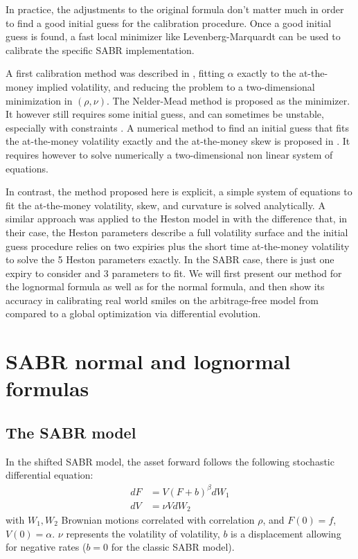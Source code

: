 \documentclass[]{rAMF2e}
\begin{document}
In practice, the adjustments to the original formula don't matter much in order to find a good initial guess for the calibration procedure. Once a good initial guess is found, a fast local minimizer like Levenberg-Marquardt can be used to calibrate the specific SABR implementation. 

A first calibration method was described in \citep{west2005calibration}, fitting $\alpha$ exactly to the at-the-money implied volatility, and reducing the problem to a two-dimensional minimization in $(\rho,\nu)$. The Nelder-Mead method is proposed as the minimizer. It however still requires some initial guess, and can sometimes be unstable, especially with constraints \citep{lefloch2014nelder}. A numerical method to find an initial guess that fits the at-the-money volatility exactly and the at-the-money skew is proposed in \citep{gauthier2009fitting}. It requires however to solve numerically a two-dimensional non linear system of equations.

In contrast, the method proposed here is explicit, a simple system of equations to fit the at-the-money volatility, skew, and curvature is solved analytically. A similar approach was applied to the Heston model in \citep{forde2012small} with the difference that, in their case, the Heston parameters describe a full volatility surface and the initial guess procedure relies on two expiries plus the short time at-the-money volatility to solve the 5 Heston parameters exactly. In the SABR case, there is just one expiry to consider and 3 parameters to fit. We will first present our method for the lognormal formula as well as for the normal formula, and then show its accuracy in calibrating real world smiles on the arbitrage-free model from \citet{hagan2013arbitrage} compared to a global optimization via differential evolution.


\section{SABR normal and lognormal formulas}

\subsection{The SABR model}
In the shifted SABR model, the asset forward follows the following stochastic differential equation:
\begin{align}
dF &= V (F+b)^\beta dW_1\\
dV &= \nu V dW_2
\end{align}
with $W_1, W_2$ Brownian motions correlated with correlation $\rho$,
and $F(0) = f$, $V(0) = \alpha$.
$\nu$ represents the volatility of volatility, $b$ is a displacement allowing for negative rates ($b=0$ for the classic SABR model).
\end{document}
